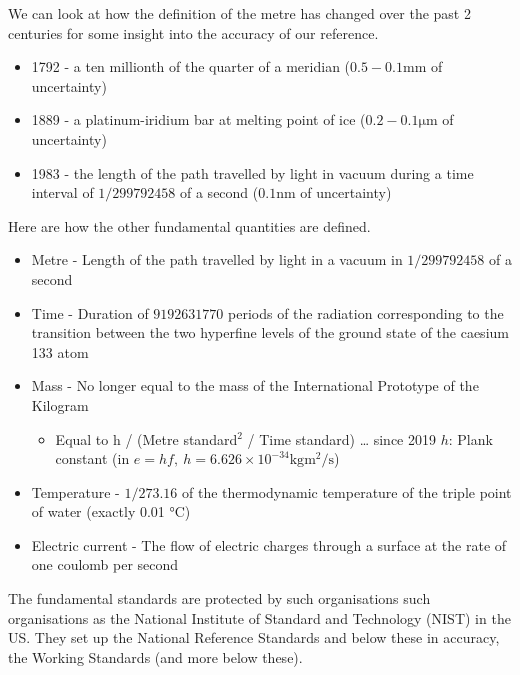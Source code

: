 We can look at how the definition of the metre has changed over the past 2 centuries for some insight into the accuracy of our reference.
\begin{itemize}
  \item 1792 - a ten millionth of the quarter of a meridian ($0.5 - 0.1 \si{\milli\m}$ of uncertainty)
  \item 1889 - a platinum-iridium bar at melting point of ice ($0.2-0.1 \si{\micro\m}$ of uncertainty)
  \item 1983 - the length of the path travelled by light in vacuum during a time interval of $1/299792458$ of a second ($0.1 \si{\nano\m}$ of uncertainty)
\end{itemize}
Here are how the other fundamental quantities are defined.
\begin{itemize}
  \item Metre - Length of the path travelled by light in a vacuum in $1/299792458$ of a second
  \item Time - Duration of $9192631770$ periods of the radiation corresponding to the transition between the two hyperfine levels of the ground state of the caesium 133 atom
  \item Mass - No longer equal to the mass of the International Prototype of the Kilogram
        \begin{itemize}
          \item Equal to h / (Metre standard$^2$ / Time standard) … since 2019
                $h$: Plank constant (in $e = hf, \ h = 6.626 \times 10^{-34} \si{\kg\m\squared\per\second}$)
        \end{itemize}
  \item Temperature - $1/273.16$ of the thermodynamic temperature
        of the triple point of water (exactly 0.01 \si{\celsius})
  \item Electric current - The flow of electric charges through
        a surface at the rate of one coulomb per second
\end{itemize}
The fundamental standards are protected by such organisations such organisations as the National Institute of Standard and Technology (NIST) in the US. They set up the National Reference Standards and below these in accuracy, the Working Standards (and more below these).
